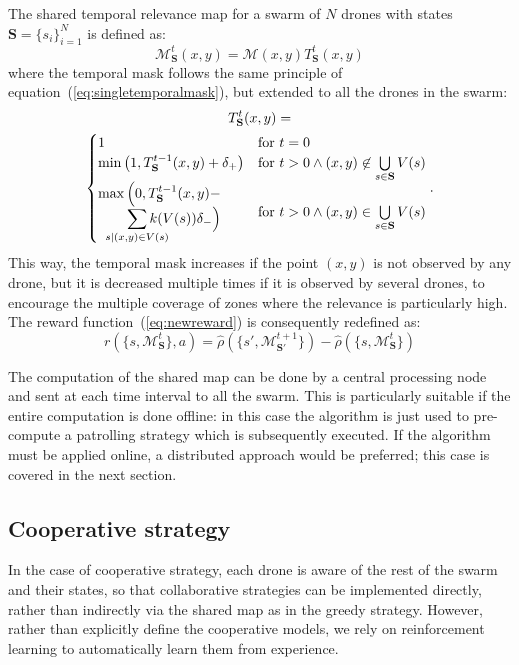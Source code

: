 \documentclass{article}
\begin{document}
The shared temporal relevance map for a swarm of $N$ drones with states $\mathbf{S}=\{s_i\}_{i=1}^N$ is defined as:
\begin{equation}
	\mathcal{M}^t_\mathbf{S}(x,y) = \mathcal{M}(x,y) T^t_\mathbf{S}(x,y)
\end{equation}
where the temporal mask follows the same principle of equation~(\ref{eq:singletemporalmask}), but extended to all the drones in the swarm:
\begin{multline}
T^t_\mathbf{S}(x,y) = \\
\begin{cases}
	1 & \text{for } t=0 \\
	\min\big(1, T^{t-1}_\mathbf{S}(x,y) + \delta_+\big) & \text{for } t>0 \land (x,y) \not\in \bigcup\limits_{s\in\mathbf{S}} V(s) \\
	\!\begin{split}
		\max\Big(0, T^{t-1}_\mathbf{S}(x,y) - &\\
		\sum_{\mathclap{s|(x,y)\in V(s)}} k(V(s))\delta_- \Big) &
	\end{split}
	& \text{for } t>0 \land (x,y) \in \bigcup\limits_{s\in\mathbf{S}} V(s) 
\end{cases}.
\label{eq:multitemporalmask}
\end{multline} 
This way, the temporal mask increases if the point $(x,y)$ is not observed by any drone, but it is decreased multiple times if it is observed by several drones, to encourage the multiple coverage of zones where the relevance is particularly high. The reward function~(\ref{eq:newreward}) is consequently redefined as:
\begin{equation}
r(\{s,\mathcal{M}_\mathbf{S}^t\},a) = \hat{\rho}(\{s',\mathcal{M}_{\mathbf{S}'}^{t+1}\})-\hat{\rho}(\{s,\mathcal{M}_\mathbf{S}^{t}\})
\label{eq:greedyreward}
\end{equation}

The computation of the shared map can be done by a central processing node and sent at each time interval to all the swarm. This is particularly suitable if the entire computation is done offline: in this case the algorithm is just used to pre-compute a patrolling strategy which is subsequently executed. If the algorithm must be applied online, a distributed approach would be preferred; this case is covered in the next section.

\subsection{Cooperative strategy}
\label{subsec:coop}
In the case of cooperative strategy, each drone is aware of the rest of the swarm and their states, so that collaborative strategies can be implemented directly, rather than indirectly via the shared map as in the greedy strategy. However, rather than explicitly define the cooperative models, we rely on reinforcement learning to automatically learn them from experience. 
\end{document}
